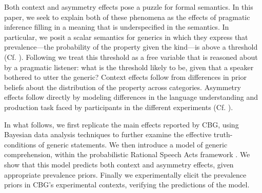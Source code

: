 \documentclass[10pt,letterpaper]{article}
\begin{document}
Both context and asymmetry effects pose a puzzle for formal semantics. 
In this paper, we seek to explain both of these phenomena as the effects of pragmatic inference filling in a meaning that is underspecified in the semantics. 
In particular, we posit a scalar semantics for generics in which they express that prevalence---the probability of the property given the kind---is above a threshold (Cf. ). Following  we treat this threshold as a free variable that is reasoned about by a pragmatic listener: what is the threshold likely to be, given that a speaker bothered to utter the generic? Context effects follow from differences in prior beliefs about the distribution of the property across categories. Asymmetry effects follow directly by modeling differences in the language understanding and production task faced by participants in the different experiments (Cf. ).  %


In what follows, we first replicate the main effects reported by CBG, using Bayesian data analysis techniques to further examine the effective truth-conditions of generic statements. We then introduce a model of generic comprehension, within the probabilistic Rational Speech Acts framework \cite{Frank2012,Goodman2013}. We show that this model predicts both context and asymmetry effects, given appropriate prevalence priors. Finally we experimentally elicit the prevalence priors in CBG's experimental contexts, verifying the predictions of the model.



\end{document}

